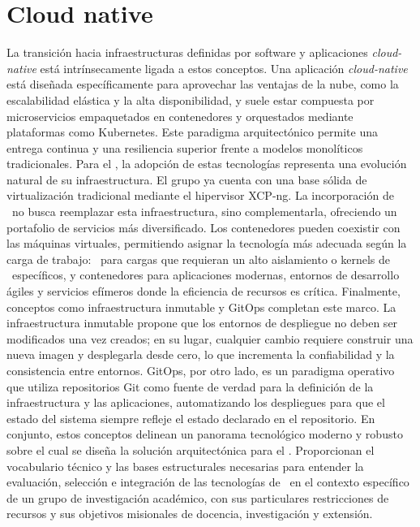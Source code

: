 \section{Cloud native}
La transición hacia infraestructuras definidas por software y aplicaciones \textit{cloud-native} está intrínsecamente ligada a estos conceptos. Una aplicación \textit{cloud-native} está diseñada específicamente para aprovechar las ventajas de la nube, como la escalabilidad elástica y la alta disponibilidad, y suele estar compuesta por microservicios empaquetados en contenedores y orquestados mediante plataformas como Kubernetes. Este paradigma arquitectónico permite una entrega continua y una resiliencia superior frente a modelos monolíticos tradicionales. Para el \GRID, la adopción de estas tecnologías representa una evolución natural de su infraestructura. El grupo ya cuenta con una base sólida de virtualización tradicional mediante el hipervisor XCP-ng. La incorporación de \VBC\ no busca reemplazar esta infraestructura, sino complementarla, ofreciendo un portafolio de servicios más diversificado. Los contenedores pueden coexistir con las máquinas virtuales, permitiendo asignar la tecnología más adecuada según la carga de trabajo: \VM\ para cargas que requieran un alto aislamiento o kernels de \OS\ específicos, y contenedores para aplicaciones modernas, entornos de desarrollo ágiles y servicios efímeros donde la eficiencia de recursos es crítica. Finalmente, conceptos como infraestructura inmutable y GitOps completan este marco. La infraestructura inmutable propone que los entornos de despliegue no deben ser modificados una vez creados; en su lugar, cualquier cambio requiere construir una nueva imagen y desplegarla desde cero, lo que incrementa la confiabilidad y la consistencia entre entornos. GitOps, por otro lado, es un paradigma operativo que utiliza repositorios Git como fuente de verdad para la definición de la infraestructura y las aplicaciones, automatizando los despliegues para que el estado del sistema siempre refleje el estado declarado en el repositorio. En conjunto, estos conceptos delinean un panorama tecnológico moderno y robusto sobre el cual se diseña la solución arquitectónica para el \GRID. Proporcionan el vocabulario técnico y las bases estructurales necesarias para entender la evaluación, selección e integración de las tecnologías de \VBC\ en el contexto específico de un grupo de investigación académico, con sus particulares restricciones de recursos y sus objetivos misionales de docencia, investigación y extensión.

